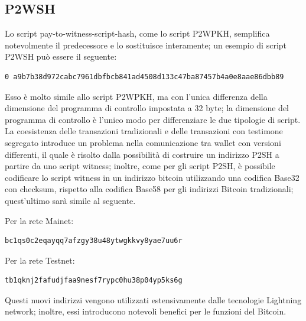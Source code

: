 \subsection{P2WSH}

Lo script pay-to-witness-script-hash, come lo script P2WPKH, semplifica notevolmente il predecessore e lo sostituisce interamente; un esempio di script P2WSH può essere il seguente:
\begin{lstlisting}[language=bitcoinscript, label={code:examplep2wsh}, caption={Esempio di uno script P2WSH.}]
0 a9b7b38d972cabc7961dbfbcb841ad4508d133c47ba87457b4a0e8aae86dbb89
\end{lstlisting}
Esso è molto simile allo script P2WPKH, ma con l’unica differenza della dimensione del programma di controllo impostata a 32 byte; la dimensione del programma di controllo è l’unico modo per differenziare le due tipologie di script.
La coesistenza delle transazioni tradizionali e delle transazioni con testimone segregato introduce  un problema nella comunicazione tra wallet con versioni differenti, il quale è risolto dalla possibilità di costruire un indirizzo P2SH a partire da uno script witness; inoltre, come per gli script P2SH, è possibile codificare lo script witness in un indirizzo bitcoin utilizzando una codifica Base32 con checksum, rispetto alla codifica Base58 per gli indirizzi Bitcoin tradizionali; quest’ultimo sarà simile al seguente.

Per la rete Mainet:
\begin{lstlisting}[language=bitcoinscript, label={code:examplep2wsh}, caption={Address base32 della rete mainet.}]
bc1qs0c2eqayqq7afzgy38u48ytwgkkvy8yae7uu6r
\end{lstlisting}
Per la rete Testnet:
\begin{lstlisting}[language=bitcoinscript, label={code:examplep2wsh}, caption={Address base32 della rete testnet.}]
tb1qknj2fafudjfaa9nesf7rypc0hu38p04yp5ks6g
\end{lstlisting}
Questi nuovi indirizzi vengono utilizzati estensivamente dalle tecnologie Lightning network; inoltre, essi introducono notevoli benefici per le funzioni del Bitcoin.

